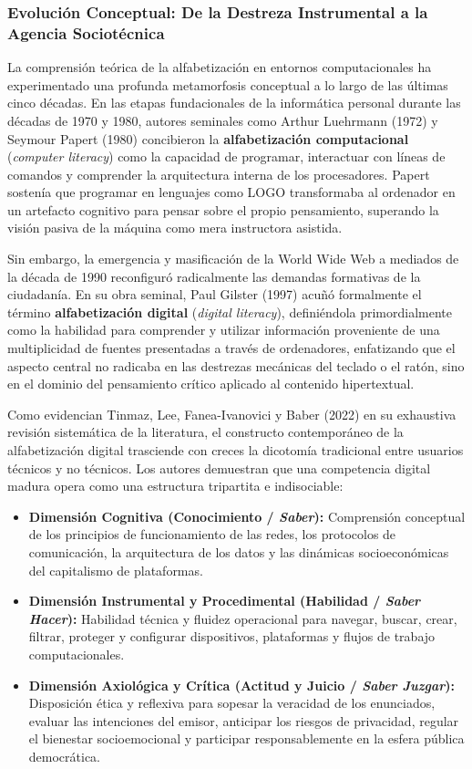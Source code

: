 \subsubsection{Evolución Conceptual: De la Destreza Instrumental a la Agencia Sociotécnica}

La comprensión teórica de la alfabetización en entornos computacionales ha experimentado una profunda metamorfosis conceptual a lo largo de las últimas cinco décadas. En las etapas fundacionales de la informática personal durante las décadas de 1970 y 1980, autores seminales como Arthur Luehrmann (1972) y Seymour Papert (1980) concibieron la \textbf{alfabetización computacional} (\textit{computer literacy}) como la capacidad de programar, interactuar con líneas de comandos y comprender la arquitectura interna de los procesadores. Papert sostenía que programar en lenguajes como LOGO transformaba al ordenador en un artefacto cognitivo para pensar sobre el propio pensamiento, superando la visión pasiva de la máquina como mera instructora asistida.

Sin embargo, la emergencia y masificación de la World Wide Web a mediados de la década de 1990 reconfiguró radicalmente las demandas formativas de la ciudadanía. En su obra seminal, Paul Gilster (1997) acuñó formalmente el término \textbf{alfabetización digital} (\textit{digital literacy}), definiéndola primordialmente como la habilidad para comprender y utilizar información proveniente de una multiplicidad de fuentes presentadas a través de ordenadores, enfatizando que el aspecto central no radicaba en las destrezas mecánicas del teclado o el ratón, sino en el dominio del pensamiento crítico aplicado al contenido hipertextual.

Como evidencian Tinmaz, Lee, Fanea-Ivanovici y Baber (2022) en su exhaustiva revisión sistemática de la literatura, el constructo contemporáneo de la alfabetización digital trasciende con creces la dicotomía tradicional entre usuarios técnicos y no técnicos. Los autores demuestran que una competencia digital madura opera como una estructura tripartita e indisociable:
\begin{itemize}
    \item \textbf{Dimensión Cognitiva (Conocimiento / \textit{Saber}):} Comprensión conceptual de los principios de funcionamiento de las redes, los protocolos de comunicación, la arquitectura de los datos y las dinámicas socioeconómicas del capitalismo de plataformas.
    \item \textbf{Dimensión Instrumental y Procedimental (Habilidad / \textit{Saber Hacer}):} Habilidad técnica y fluidez operacional para navegar, buscar, crear, filtrar, proteger y configurar dispositivos, plataformas y flujos de trabajo computacionales.
    \item \textbf{Dimensión Axiológica y Crítica (Actitud y Juicio / \textit{Saber Juzgar}):} Disposición ética y reflexiva para sopesar la veracidad de los enunciados, evaluar las intenciones del emisor, anticipar los riesgos de privacidad, regular el bienestar socioemocional y participar responsablemente en la esfera pública democrática.
\end{itemize}

